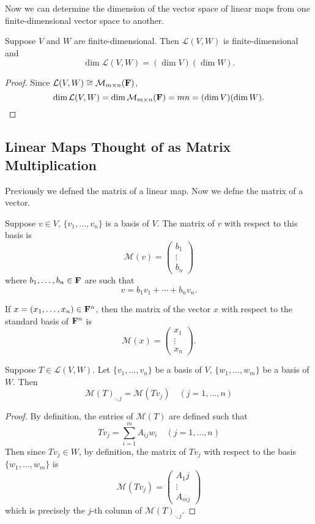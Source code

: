 Now we can determine the dimension of the vector space of linear maps from one finite-dimensional vector space to another.

\begin{corollary}\label{cor:dimension-vector-space-of-linear-maps}
Suppose $V$ and $W$ are finite-dimensional. Then $\mathcal{L}(V,W)$ is finite-dimensional and
\[\dim\mathcal{L}(V,W)=(\dim V)(\dim W).\]
\end{corollary}

\begin{proof}
Since $\mathcal{L}(V,W)\cong\mathcal{M}_{m\times n}(\mathbf F)$,
\[\dim\mathcal{L}(V,W)=\dim\mathcal{M}_{m\times n}(\mathbf F)=mn=(\dim V)(\dim W).\]
\end{proof}
\pagebreak

\subsection{Linear Maps Thought of as Matrix Multiplication}
Previously we defned the matrix of a linear map. Now we defne the matrix of a vector.

\begin{definition}
Suppose $v\in V$, $\{v_1,\dots,v_n\}$ is a basis of $V$. The matrix of $v$ with respect to this basis is
\[\mathcal{M}(v)=\begin{pmatrix}
b_1\\\vdots\\b_n
\end{pmatrix}\]
where $b_1,\dots,b_n\in\mathbf F$ are such that
\[v=b_1v_1+\cdots+b_nv_n.\]
\end{definition}

\begin{example}
If $x=(x_1,\dots,x_n)\in\mathbf F^n$, then the matrix of the vector $x$ with respect to the standard basis of $\mathbf F^n$ is
\[\mathcal{M}(x)=\begin{pmatrix}
x_1\\\vdots\\x_n
\end{pmatrix}.\]
\end{example}

\begin{lemma}
Suppose $T\in\mathcal{L}(V,W)$. Let $\{v_1,\dots,v_n\}$ be a basis of $V$, $\{w_1,\dots,w_m\}$ be a basis of $W$. Then
\[\mathcal{M}(T)_{\cdot,j}=\mathcal{M}(Tv_j)\quad(j=1,\dots,n)\]
\end{lemma}

\begin{proof}
By definition, the entries of $\mathcal{M}(T)$ are defined such that
\[Tv_j=\sum_{i=1}^{m}A_{ij}w_i\quad(j=1,\dots,n)\]
Then since $Tv_j\in W$, by definition, the matrix of $Tv_j$ with respect to the basis $\{w_1,\dots,w_m\}$ is
\[\mathcal{M}(Tv_j)=\begin{pmatrix}
A_1j\\\vdots\\A_{mj}
\end{pmatrix}\]
which is precisely the $j$-th column of $\mathcal{M}(T)_{\cdot,j}$.
\end{proof}

